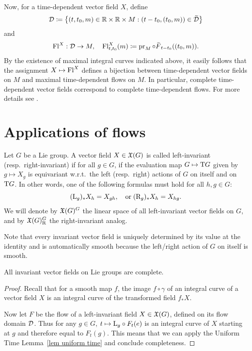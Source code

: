 \begin{rem}
    Now, for a time-dependent vector field $X$, define 
    \[\calD\coloneqq \left\{(t,t_0,m)\in\bbR\times\bbR\times M:(t-t_0,(t_0,m))\in\wt\calD\right\}\]
    and 
    \[\Fl^X:\calD\to M,\quad \Fl^X_{t,t_0}(m)\coloneqq \pr_M\circ \wt{F}_{t-t_0}((t_0,m)).\]
    By the existence of maximal integral curves indicated above, it easily follows that the assignment $X\mapsto \mathrm{Fl}^X$ defines a bijection between time-dependent vector fields on $M$ and maximal time-dependent flows on $M$. In particular, complete time-dependent vector fields correspond to complete time-dependent flows. For more details see \cite[Sec.~3.4]{RS1}.
\end{rem}













\section{Applications of flows}\label{sec: applications of flows}



\begin{defn}
    Let $G$ be a Lie group. A vector field $X\in\mathfrak{X}(G)$ is called left-invariant (resp.~right-invariant) if for all $g\in G$, if the evaluation map $G\mapsto \mathrm{T} G$ given by $g\mapsto X_g$ is equivariant w.r.t.\ the left (resp.~right) actions of $G$ on itself and on $\mathrm{T} G$. In other words, one of the following formulas must hold for all $h,g\in G$:
    \[(\mathrm{L}_g)_{\ast}X_h=X_{gh},\quad \text{or}\; (\mathrm{R}_g)_{\ast}X_h=X_{hg}.\]
    We will denote by $\mathfrak{X}(G)^G$ the linear space of all left-invariant vector fields on $G$, and by $\mathfrak{X}(G)^G_{\mathrm{R}}$ the right-invariant analog.
\end{defn}

Note that every invariant vector field is uniquely determined by its value at the identity and is automatically smooth because the left/right action of $G$ on itself is smooth.

\begin{thm}\label{thm invariant fields are complete}
    All invariant vector fields on Lie groups are complete.
\end{thm}
\begin{proof}
    Recall that for a smooth map $f$, the image $f\circ\gamma$ of an integral curve of a vector field $X$ is an integral curve of the transformed field $f_\ast X$. 
    
    Now let $F$ be the flow of a left-invariant field $X\in \mathfrak{X}(G)$, defined on its flow domain $\mathcal{D}$. Thus for any $g\in G$, $t\mapsto \mathrm{L}_g\circ F_t(e)$ is an integral curve of $X$ starting at $g$ and therefore equal to $F_t(g)$. This means that we can apply the Uniform Time Lemma~\ref{lem uniform time} and conclude completeness.
\end{proof}

